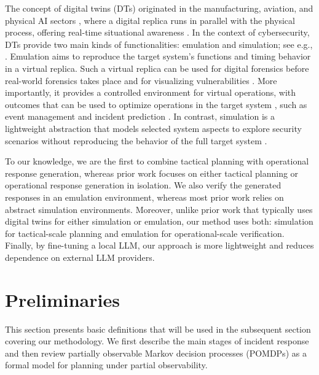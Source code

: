 \documentclass[runningheads,10pt]{llncs}
\begin{document}
The concept of digital twins (DTs) originated in the manufacturing, aviation, and physical AI sectors \cite{grieves2016digital,tao25dt-pirl}, where a digital replica runs in parallel with the physical process, offering real-time situational awareness \cite{grieves2016digital,tao25dima}. In the context of cybersecurity, DTs provide two main kinds of functionalities: emulation and simulation; see e.g., \cite{dietz21dt-forensics,weippl19dt-aware,maclaughlin22dt-ml,pernul20dt,colomo20dt-survery,repetto26cdt,pernul20dt-soc}. Emulation aims to reproduce the target system’s functions and timing behavior in a virtual replica. Such a virtual replica can be used for digital forensics before real-world forensics takes place \cite{dietz21dt-forensics} and for visualizing vulnerabilities \cite{weippl19dt-aware}. More importantly, it provides a controlled environment for virtual operations, with outcomes that can be used to optimize operations in the target system \cite{repetto26cdt}, such as event management \cite{pernul20dt} and incident prediction \cite{colomo20dt-survery}. In contrast, simulation is a lightweight abstraction that models selected system aspects to explore security scenarios without reproducing the behavior of the full target system \cite{hammarcsle}.

 To our knowledge, we are the first to combine tactical planning with operational response generation, whereas prior work focuses on either tactical planning or operational response generation in isolation. We also verify the generated responses in an emulation environment, whereas most prior work relies on abstract simulation environments. Moreover, unlike prior work that typically uses digital twins for either simulation or emulation, our method uses both: simulation for tactical-scale planning and emulation for operational-scale verification. Finally, by fine-tuning a local LLM, our approach is more lightweight and reduces dependence on external LLM providers.

\section{Preliminaries}
\label{sec:pre}
This section presents basic definitions that will be used in the subsequent section covering our methodology. We first describe the main stages of incident response and then review partially observable Markov decision processes (POMDPs) as a formal model for planning under partial observability.
\end{document}
